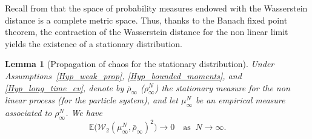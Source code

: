 \documentclass[JEP,XML,SOM,Unicode,published]{cedram}
\theoremstyle{plain}
\newtheorem{lemma}{Lemma}[section]
\theoremstyle{definition}
\begin{document}
Recall from \cite{bolley_separability} that the space of probability measures endowed with the Wasserstein distance is a complete metric space. Thus, thanks to the Banach fixed point theorem, the contraction of the Wasserstein distance for the non linear limit yields the existence of a stationary distribution.

\begin{lemma}[Propagation of chaos for the stationary distribution]
Under Assumptions~\ref{Hyp_weak_prop}, \ref{Hyp_bounded_moments}, and \ref{Hyp_long_time_cv}, denote by $\bar{\rho}_{\infty}$ (\resp $\rho^N_{\infty}$) the stationary measure for the non linear process (\resp for the particle system), and let $\mu^N_{\infty}$ be an empirical measure associated to $\rho^N_{\infty}$. We have
\[
\mathbb{E}\bigl(\mathcal{W}_2\left(\mu^N_{\infty},\bar{\rho}_{\infty}\right)^2\bigr)\to 0\quad\text{as }\ N\to\infty.
\]
\end{lemma}
\end{document}
